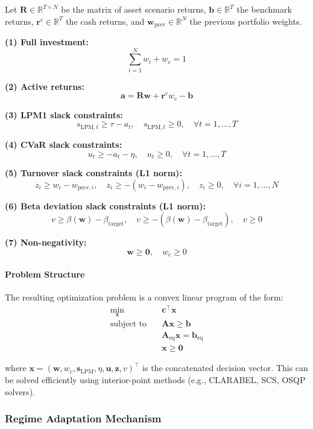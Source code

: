 Let $\mathbf{R} \in \mathbb{R}^{T \times N}$ be the matrix of asset scenario returns, $\mathbf{b} \in \mathbb{R}^T$ the benchmark returns, $\mathbf{r}^c \in \mathbb{R}^T$ the cash returns, and $\mathbf{w}_{\text{prev}} \in \mathbb{R}^N$ the previous portfolio weights.

\textbf{(1) Full investment:}
\[
\sum_{i=1}^N w_i + w_c = 1
\]

\textbf{(2) Active returns:}
\[
\mathbf{a} = \mathbf{R} \mathbf{w} + \mathbf{r}^c w_c - \mathbf{b}
\]

\textbf{(3) LPM1 slack constraints:}
\[
s_{\text{LPM}, t} \geq \tau - a_t, \quad s_{\text{LPM}, t} \geq 0, \quad \forall t = 1, \ldots, T
\]

\textbf{(4) CVaR slack constraints:}
\[
u_t \geq -a_t - \eta, \quad u_t \geq 0, \quad \forall t = 1, \ldots, T
\]

\textbf{(5) Turnover slack constraints (L1 norm):}
\[
z_i \geq w_i - w_{\text{prev}, i}, \quad z_i \geq -(w_i - w_{\text{prev}, i}), \quad z_i \geq 0, \quad \forall i = 1, \ldots, N
\]

\textbf{(6) Beta deviation slack constraints (L1 norm):}
\[
v \geq \beta(\mathbf{w}) - \beta_{\text{target}}, \quad v \geq -(\beta(\mathbf{w}) - \beta_{\text{target}}), \quad v \geq 0
\]

\textbf{(7) Non-negativity:}
\[
\mathbf{w} \geq \mathbf{0}, \quad w_c \geq 0
\]

\paragraph{Problem Structure}

The resulting optimization problem is a convex linear program of the form:
\begin{align*}
\min_{\mathbf{x}} \quad & \mathbf{c}^\top \mathbf{x} \\
\text{subject to} \quad & \mathbf{A} \mathbf{x} \geq \mathbf{b} \\
& \mathbf{A}_{\text{eq}} \mathbf{x} = \mathbf{b}_{\text{eq}} \\
& \mathbf{x} \geq \mathbf{0}
\end{align*}

where $\mathbf{x} = (\mathbf{w}, w_c, \mathbf{s}_{\text{LPM}}, \eta, \mathbf{u}, \mathbf{z}, v)^\top$ is the concatenated decision vector. This can be solved efficiently using interior-point methods (e.g., CLARABEL, SCS, OSQP solvers).

\subsubsection{Regime Adaptation Mechanism}

